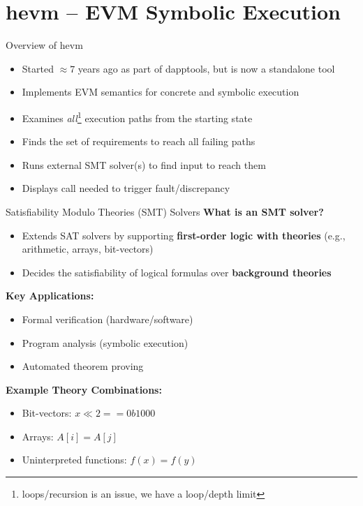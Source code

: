 \documentclass[aspectratio=169]{beamer}
\begin{document}
\section{hevm -- EVM Symbolic Execution}
\begin{frame}{Overview of hevm}
\begin{itemize}
\item Started $\approx7$ years ago as part of dapptools, but is now a standalone tool
\item Implements EVM semantics for concrete and symbolic execution
\item Examines \emph{all}\footnote{loops/recursion is an issue, we have a loop/depth limit} execution paths from the starting state
\item Finds the set of requirements to reach all failing paths
\item Runs external SMT solver(s) to find input to reach them
\item Displays call needed to trigger fault/discrepancy
\end{itemize}
\end{frame}

\begin{frame} {Satisfiability Modulo Theories (SMT) Solvers}
\textbf{What is an SMT solver?}
\begin{itemize}
    \item Extends SAT solvers by supporting \textbf{first-order logic with theories} (e.g., arithmetic, arrays, bit-vectors)
    \item Decides the satisfiability of logical formulas over \textbf{background theories}
\end{itemize}

\textbf{Key Applications:}
\begin{itemize}
    \item Formal verification (hardware/software)
    \item Program analysis (symbolic execution)
    \item Automated theorem proving
\end{itemize}

\textbf{Example Theory Combinations:}
\begin{itemize}
    \item Bit-vectors: $x \ll 2 == 0b1000$
    \item Arrays: $A[i] = A[j]$
    \item Uninterpreted functions: $f(x) = f(y)$
\end{itemize}
\end{frame}
\end{document}
